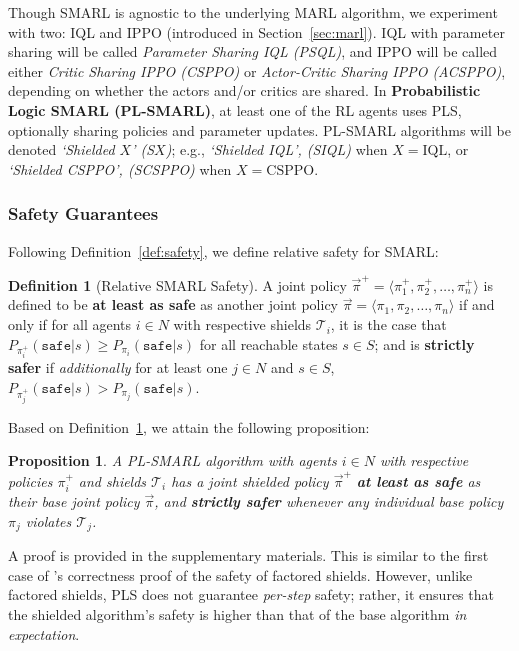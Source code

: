 \documentclass{ecai}
\theoremstyle{plain}
\newtheorem{proposition}[theorem]{Proposition}
\theoremstyle{definition}
\newtheorem{definition}[theorem]{Definition}
\theoremstyle{remark}
\begin{document}
Though SMARL is agnostic to the underlying MARL algorithm, we experiment with two: IQL and IPPO (introduced in Section~\ref{sec:marl}). IQL with parameter sharing will be called \textit{Parameter Sharing IQL (PSQL)}, and IPPO will be called either \textit{Critic Sharing IPPO (CSPPO)} or \textit{Actor-Critic Sharing IPPO (ACSPPO)}, depending on whether the actors and/or critics are shared. In \textbf{Probabilistic Logic SMARL (PL-SMARL)}, at least one of the RL agents uses PLS, optionally sharing policies and parameter updates. PL-SMARL algorithms will be denoted \textit{`Shielded $X$' (S$X$)}; e.g., \textit{`Shielded IQL', (SIQL)} when $X=\text{IQL}$, or \textit{`Shielded CSPPO', (SCSPPO)} when $X=\text{CSPPO}$.

\subsubsection{Safety Guarantees}

Following Definition~\ref{def:safety}, we define relative safety for SMARL:
\begin{definition}[Relative SMARL Safety]\label{def:marlsafety}
    A joint policy $\vec\pi^+=\langle\pi_1^+,\pi_2^+,\ldots,\pi_n^+\rangle$ is defined to be \textbf{at least as safe} as another joint policy $\vec\pi=\langle\pi_1,\pi_2,\ldots,\pi_n\rangle$ if and only if for all agents $i\in N$ with respective shields $\mathcal{T}_i$, it is the case that $P_{\pi^+_i}(\texttt{safe} | s) \geq P_{\pi_i}(\texttt{safe} | s)$ for all reachable states $s\in S$; and is \textbf{strictly safer} if \textit{additionally} for at least one $j\in N$ and $s\in S$, $P_{\pi^+_j}(\texttt{safe} | s) > P_{\pi_j}(\texttt{safe} | s)$.
\end{definition}
\noindent Based on Definition~\ref{def:marlsafety}, we attain the following proposition:
\begin{proposition} \label{proposition:safety}
    A PL-SMARL algorithm with agents $i\in N$ with respective policies $\pi_i^+$ and shields $\mathcal{T}_i$ has a joint shielded policy $\vec\pi^+$ \textbf{at least as safe} as their base joint policy $\vec\pi$, and \textbf{strictly safer} whenever any individual base policy $\pi_j$ violates $\mathcal{T}_j$.
\end{proposition}

A proof is provided in the supplementary materials. This is similar to the first case of \citet{elsayed2021safe}'s correctness proof of the safety of factored shields. However, unlike factored shields, PLS does not guarantee \textit{per-step} safety; rather, it ensures that the 
shielded algorithm's safety is higher than that of the base algorithm \textit{in expectation}.
\end{document}
